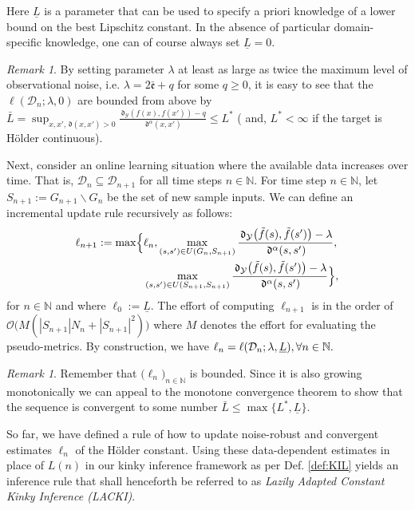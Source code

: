 \documentclass{article} %
\theoremstyle{definition}
\theoremstyle{remark}
\newtheorem{rem}[thm]{Remark}
\newcommand{\abs}[1]{\left\vert#1\right\vert}
\newcommand{\nat}{\mathbb N}
\newcommand{\data}{\ensuremath{ \mathcal D} }
\newcommand{\outspace}{\ensuremath{ \mathcal Y}}
\newcommand{\grid}{\ensuremath{  G}}
\newcommand{\metric}{\, \mathfrak{d}} %
\newcommand{\hexp}{{ \alpha }}%
\newcommand{\hestthresh}{\ensuremath{ \lambda}}
\newcommand{\obserrbnd}{\bar{\mathfrak e}}
\newcommand{\seq}[2]{\ensuremath{\bigl(#1\bigr)_{#2}}}
\begin{document}
%
Here $\underline L$ is a parameter that can be used to specify a priori knowledge of a lower bound on the best Lipschitz constant. In the absence of particular domain-specific knowledge, one can of course always set $\underline L =0$.
%
\begin{rem} \label{rem:bndedlipconstestimates}
By setting parameter $\hestthresh$ at least as large as twice the maximum level of observational noise, i.e. $\hestthresh = 2 \obserrbnd + q$ for some $q\geq0$, it is easy to see that the $\ell(\data_n;\hestthresh,0)$ are bounded from above by $\bar L  =\sup_{x,x', \metric(x,x') >0} \frac{\metric_\outspace(f(x), f(x'))   -q}{\metric^\hexp(x,x')} \leq L^* $ ( and,  $L^* < \infty$ if the target is H\"older continuous). 
\end{rem}
%
Next, consider an online learning situation where the available data increases over time. 
That is, $\data_n \subseteq \data_{n+1}$ for all time steps $n \in \nat$. 
For time step $n \in \nat$, let $S_{n+1} := G_{n+1} \backslash \grid_n$ be the set of new sample inputs.
We can define an incremental update rule recursively as follows: 
\begin{align} \label{eq:Hoelconstlazyupdateincr_main}
\ell_{n+1} := \max\Bigl\{ & \ell_n, \max_{(s,s') \in U(\grid_n, S_{n+1})} \frac{\metric_\outspace\bigl(\tilde f(s),\tilde f(s')\bigr) - \hestthresh}{\metric^\hexp(s,s')},\\
&\max_{(s,s') \in U(S_{n+1}, S_{n+1})} \frac{\metric_\outspace\bigl(\tilde f(s),\tilde f(s')\bigr) - \hestthresh}{\metric^\hexp(s,s')} \Bigr\},
\end{align} for $n \in \nat$ 
and where 
$\ell_0 := \underline L$. 
The effort of computing $\ell_{n+1}$ is in the order of $\mathcal O\bigl(M (\abs{S_{n+1}} N_n+ \abs{S_{n+1}}^2)\bigr)$ where $M$ denotes the effort for evaluating the pseudo-metrics.
By construction, we have $\ell_n =\ell(\mathcal \data_n;\hestthresh,\underline L), \forall n \in \nat.$ 

\begin{rem}\label{rem:convlipconstestimates}
Remember that $\seq{\ell_n}{n\in \nat}$ is bounded. Since it is also growing monotonically we can appeal to the monotone convergence theorem to show that the sequence is convergent to some number $\bar L \leq \max\{L^*,\underline L\}$.
\end{rem}

So far, we have defined a rule of how to update noise-robust and convergent estimates $\ell_n$ of the H\"older constant. Using these data-dependent estimates in place of $L(n)$ in our kinky inference framework as per Def. \ref{def:KIL} yields an inference rule that shall henceforth be referred to as \textit{Lazily Adapted Constant Kinky Inference (LACKI)}.
\end{document}
